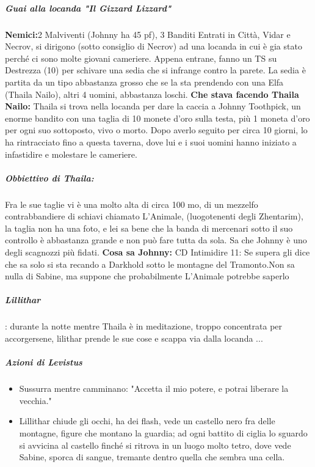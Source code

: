 \documentclass{article}
\begin{document}
            \subparagraph{Guai alla locanda "Il Gizzard Lizzard" }
            \textbf{Nemici:}2 Malviventi (Johnny ha 45 pf), 3 Banditi
            Entrati in Città, Vidar e Necrov, si dirigono (sotto consiglio di Necrov) ad una locanda in cui è gia stato perché ci sono molte giovani cameriere. Appena entrane, fanno un TS su Destrezza (10) per schivare una sedia che si infrange contro la parete. La sedia è partita da un tipo abbastanza grosso che se la sta prendendo con una Elfa (Thaila Nailo), altri 4 uomini, abbastanza loschi. 
            \textbf{Che stava facendo Thaila Nailo:} Thaila si trova nella locanda per dare la caccia a Johnny Toothpick, un enorme bandito con una taglia di 10 monete d'oro sulla testa, più 1 moneta d'oro per ogni suo sottoposto, vivo o morto. Dopo averlo seguito per circa 10 giorni, lo ha rintracciato fino a questa taverna, dove lui e i suoi uomini hanno iniziato a infastidire e molestare le cameriere.
           
           
            
            \subparagraph{Obbiettivo di Thaila: } Fra le sue taglie vi è una molto alta di circa 100 mo, di un mezzelfo contrabbandiere di schiavi chiamato L'Animale, (luogotenenti degli Zhentarim), la taglia non ha una foto, e lei sa bene che la banda di mercenari sotto il suo controllo è abbastanza grande e non può fare tutta da sola. Sa che Johnny è uno degli scagnozzi più fidati. 
                \textbf{Cosa sa Johnny: } CD Intimidire 11: Se supera gli dice che sa solo si sta recando a Darkhold sotto le montagne del Tramonto.Non sa nulla di Sabine, ma suppone che probabilmente L'Animale potrebbe saperlo

            \subparagraph{Lillithar}: durante la notte mentre Thaila è in meditazione, troppo concentrata per accorgersene, lilithar prende le sue cose e scappa via dalla locanda ... 
                \subparagraph{Azioni di Levistus}
                \begin{itemize}
                    \item Sussurra mentre camminano: "Accetta il mio potere, e potrai liberare la vecchia."
                    \item Lillithar chiude gli occhi, ha dei flash, vede un castello nero fra delle montagne, figure che montano la guardia; ad ogni battito di ciglia lo sguardo si avvicina al castello finché si ritrova in un luogo molto tetro, dove vede Sabine, sporca di sangue, tremante dentro quella che sembra una cella.
                \end{itemize}
                
\end{document}
